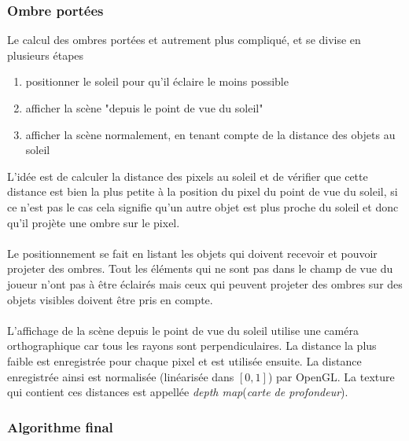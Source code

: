 \documentclass[11pt]{article} %
\begin{document}
\subsubsection{Ombre portées}
Le calcul des ombres portées et autrement plus compliqué, et se divise en plusieurs étapes
\begin{enumerate}
\itemsep-.5em
\item positionner le soleil pour qu'il éclaire le moins possible
\item afficher la scène "depuis le point de vue du soleil"
\item afficher la scène normalement, en tenant compte de la distance des objets au soleil
\end{enumerate}


L'idée est de calculer la distance des pixels au soleil et de vérifier que cette distance est bien la plus petite à la position du pixel du point de vue du soleil, si ce n'est pas le cas cela signifie qu'un autre objet est plus proche du soleil et donc qu'il projète une ombre sur le pixel.
\paragraph{}
Le positionnement se fait en listant les objets qui doivent recevoir et pouvoir projeter des ombres. Tout les éléments qui ne sont pas dans le champ de vue du joueur n'ont pas à être éclairés mais ceux qui peuvent projeter des ombres sur des objets visibles doivent être pris en compte.
\paragraph{}
L'affichage de la scène depuis le point de vue du soleil utilise une caméra orthographique car tous les rayons sont perpendiculaires. La distance la plus faible est enregistrée pour chaque pixel et est utilisée ensuite. La distance enregistrée ainsi est normalisée (linéarisée dans $[0,1]$) par OpenGL. La texture qui contient ces distances est appellée \textit{depth map}(\textit{carte de profondeur}).

\subsubsection{Algorithme final}
\end{document}

